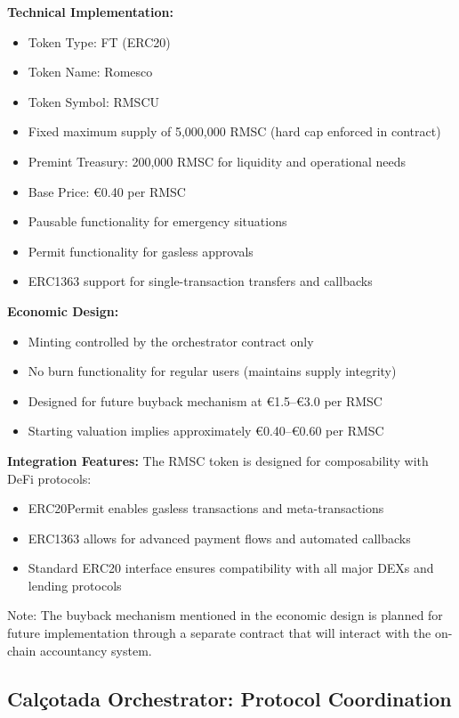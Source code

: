 \documentclass[conference]{IEEEtran}
\begin{document}
\textbf{Technical Implementation:}
\begin{itemize}
    \item Token Type: FT (ERC20)
    \item Token Name: Romesco
    \item Token Symbol: RMSCU
    \item Fixed maximum supply of 5,000,000 RMSC (hard cap enforced in contract)
    \item Premint Treasury: 200,000 RMSC for liquidity and operational needs
    \item Base Price: €0.40 per RMSC
    \item Pausable functionality for emergency situations
    \item Permit functionality for gasless approvals
    \item ERC1363 support for single-transaction transfers and callbacks
\end{itemize}

\textbf{Economic Design:}
\begin{itemize}
    \item Minting controlled by the orchestrator contract only
    \item No burn functionality for regular users (maintains supply integrity)
    \item Designed for future buyback mechanism at €1.5–€3.0 per RMSC
    \item Starting valuation implies approximately €0.40–€0.60 per RMSC
\end{itemize}

\textbf{Integration Features:}
The RMSC token is designed for composability with DeFi protocols:
\begin{itemize}
    \item ERC20Permit enables gasless transactions and meta-transactions
    \item ERC1363 allows for advanced payment flows and automated callbacks
    \item Standard ERC20 interface ensures compatibility with all major DEXs and lending protocols
\end{itemize}

Note: The buyback mechanism mentioned in the economic design is planned for future implementation through a separate contract that will interact with the on-chain accountancy system.

\subsection{Calçotada Orchestrator: Protocol Coordination}
\end{document}
